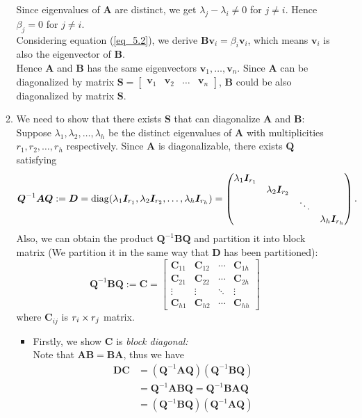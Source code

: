 \begin{enumerate}
\begin{enumerate}
\[\]
Since eigenvalues of $\bm A$ are distinct, we get $\lambda_j-\lambda_i\ne0$ for $j\ne i.$ Hence $\beta_j=0$ for $j\ne i.$\\
Considering equation (\ref{eq_5.2}), we derive $\bm B\bm v_i=\beta_i\bm v_i$, which means $\bm v_i$ is also the eigenvector of $\bm B$.\\
Hence $\bm A$ and $\bm B$ has the same eigenvectors $\bm v_1,\dots,\bm v_n$. Since $\bm A$ can be diagonalized by matrix $\bm S=\begin{bmatrix}
\bm v_1&\bm v_2&\dots&\bm v_n
\end{bmatrix}$, $\bm B$ could be also diagonalized by matrix $\bm S$.
\item
We need to show that there exists $\bm S$ that can diagonalize $\bm A$ and $\bm B$:\\
Suppose $\lambda_1,\lambda_2,\dots,\lambda_h$ be the distinct eigenvalues of $\bm A$ with multiplicities $r_1,r_2,\dots,r_h$ respectively. Since $\bm A$ is diagonalizable, there exists $\bm Q$ satisfying
\[
\bm Q^{-1}\bm A\bm Q:=\bm D=\operatorname{diag}(\lambda_1\bm I_{r_1},\lambda_2\bm I_{r_2},\dots,\lambda_h\bm I_{r_h})
=\begin{pmatrix}
\lambda_1\bm I_{r_1}&  &  &\\
&\lambda_2\bm I_{r_2}&  &\\
&&\ddots&\\
&&&\lambda_h\bm I_{r_h}
\end{pmatrix}.
\]
Also, we can obtain the product $\bm Q^{-1}\bm B\bm Q$ and partition it into block matrix (We partition it in the same way that $\bm D$ has been partitioned):
\[
\bm Q^{-1}\bm B\bm Q:=\bm C=\begin{bmatrix}
\bm C_{11}&\bm C_{12}&\cdots&\bm C_{1h}\\
\bm C_{21}&\bm C_{22}&\cdots&\bm C_{2h}\\
\vdots&\vdots&\ddots&\vdots\\
\bm C_{h1}&\bm C_{h2}&\cdots&\bm C_{hh}
\end{bmatrix}
\]
where $\bm C_{ij}$ is $r_{i}\times r_{j}$ matrix.
\begin{itemize}
\item
Firstly, we show $\bm C$ is \textit{block diagonal:}\\
Note that $\bm{AB}=\bm{BA}$, thus we have
\[
\begin{aligned}
\bm D\bm C&=(\bm Q^{-1}\bm A\bm Q)(\bm Q^{-1}\bm B\bm Q)\\
&=\bm Q^{-1}\bm A\bm B\bm Q=\bm Q^{-1}\bm B\bm A\bm Q\\
&=(\bm Q^{-1}\bm B\bm Q)(\bm Q^{-1}\bm A\bm Q)\\

\end{aligned}\]
\end{itemize}
\end{enumerate}
\end{enumerate}
